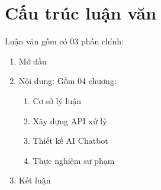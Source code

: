 \section{Cấu trúc luận văn}
Luận văn gồm có 03 phần chính:
\begin{enumerate}[label=\textbf{Phần \arabic*.},align=left,left=0cm]
	\item Mở đầu
	\item Nội dung: Gồm 04 chương:\par
		\begin{enumerate}[label=Chương \arabic*.,align=left]
			\item Cơ sở lý luận
			\item Xây dựng API xử lý
			\item Thiết kế AI Chatbot
			\item Thực nghiệm sư phạm
		\end{enumerate}
	\item Kết luận
\end{enumerate}

\renewcommand*{\thesection}{\arabic{chapter}.\arabic{section}}
\renewcommand*{\thesubsection}{\arabic{chapter}.\arabic{section}.\arabic{subsection}}
